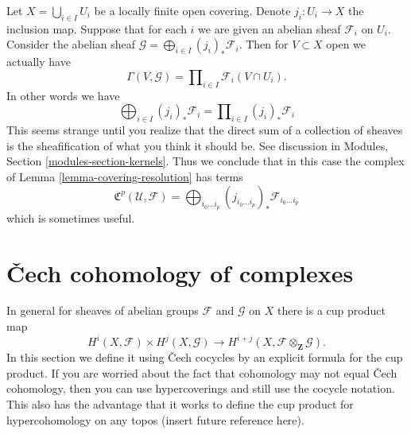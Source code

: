 \begin{remark}
\label{remark-locally-finite-sections}
Let $X = \bigcup_{i \in I} U_i$ be a locally finite open covering.
Denote $j_i : U_i \to X$ the inclusion map. Suppose that for each $i$
we are given an abelian sheaf $\mathcal{F}_i$ on $U_i$. Consider the
abelian sheaf $\mathcal{G} = \bigoplus_{i \in I} (j_i)_*\mathcal{F}_i$.
Then for $V \subset X$ open we actually have
$$
\Gamma(V, \mathcal{G}) = \prod\nolimits_{i \in I} \mathcal{F}_i(V \cap U_i).
$$
In other words we have
$$
\bigoplus\nolimits_{i \in I} (j_i)_*\mathcal{F}_i =
\prod\nolimits_{i \in I} (j_i)_*\mathcal{F}_i
$$
This seems strange until you realize that the direct sum of a collection
of sheaves is the sheafification of what you think it should be.
See discussion in Modules, Section \ref{modules-section-kernels}.
Thus we conclude that in this case the complex of
Lemma \ref{lemma-covering-resolution} has terms
$$
{\mathfrak C}^p(\mathcal{U}, \mathcal{F}) =
\bigoplus\nolimits_{i_0 \ldots i_p}
(j_{i_0 \ldots i_p})_* \mathcal{F}_{i_0 \ldots i_p}
$$
which is sometimes useful.
\end{remark}











\section{{\v C}ech cohomology of complexes}
\label{section-cech-cohomology-of-complexes}

\noindent
In general for sheaves of abelian groups
${\mathcal F}$ and ${\mathcal G}$ on $X$ there is a cup product map
$$
H^i(X, {\mathcal F}) \times H^j(X, {\mathcal G})
\longrightarrow
H^{i + j}(X, {\mathcal F} \otimes_{\mathbf Z} {\mathcal G}).
$$
In this section we define it using {\v C}ech cocycles by an explicit formula
for the cup product. If you are worried about the fact that cohomology may not
equal {\v C}ech cohomology, then you can use hypercoverings and still
use the cocycle notation. This also has the advantage that
it works to define the cup product for hypercohomology on any topos (insert
future reference here).

